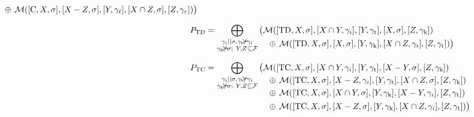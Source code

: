 \begin{theorem}
{\begin{align*}
\begin{aligned}[t]
            &\quad\oplus\,
                \mergeHist([\evtC, X, \sigma], [X - Z, \sigma], [Y, \gamma\lchild], [X \cap Z, \sigma], [Z, \gamma\rchild])\big)
        \end{aligned} \\[1.5ex]
        P_{\evtTD} &= \bigoplus_{\substack{
            \gamma_i \nottcomp \sigma,
            \gamma\targetChild \nottancsneq \gamma_i \\
            \gamma\conservChild \nottancsneq \sigma;~
            Y, Z \subseteq \geneFamilySet
        }} \begin{aligned}[t]
            &\big(
                \mergeHist([\evtTD, X, \sigma], [X \cap Y, \gamma_i], [Y, \gamma\targetChild], [X, \sigma], [Z, \gamma\conservChild]) \\
            &\quad\oplus\,
                \mergeHist([\evtTD, X, \sigma], [X, \sigma], [Y, \gamma\conservChild], [X \cap Z, \gamma_i], [Z, \gamma\targetChild])\big)
        \end{aligned} \\[1.5ex]
        P_{\evtTC} &= \bigoplus_{\substack{
            \gamma_i \nottcomp \sigma,
            \gamma\targetChild \nottancsneq \gamma_i \\
            \gamma\conservChild \nottancsneq \sigma;~
            Y, Z \subseteq \geneFamilySet
        }} \begin{aligned}[t]
            &\big(
                \mergeHist([\evtTC, X, \sigma], [X \cap Y, \gamma_i], [Y, \gamma\targetChild], [X - Y, \sigma], [Z, \gamma\conservChild]) \\
            &\quad\oplus\,
                \mergeHist([\evtTC, X, \sigma], [X - Z, \gamma_i], [Y, \gamma\targetChild], [X \cap Z, \sigma], [Z, \gamma\conservChild]) \\
            &\quad\oplus\,
                \mergeHist([\evtTC, X, \sigma], [X \cap Y, \sigma], [Y, \gamma\conservChild], [X - Y, \gamma_i], [Z, \gamma\targetChild]) \\
            &\quad\oplus\,
                \mergeHist([\evtTC, X, \sigma], [X - Z, \sigma], [Y, \gamma\conservChild], [X \cap Z, \gamma_i], [Z, \gamma\targetChild])\big)
        \end{aligned}
    \end{align*}}
\end{theorem}
